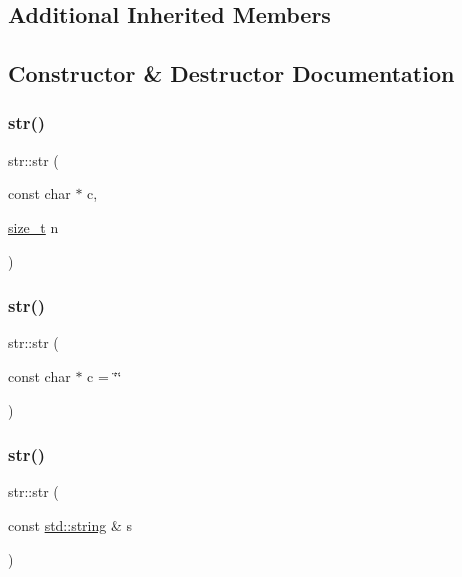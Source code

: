 \subsection*{Additional Inherited Members}


\subsection{Constructor \& Destructor Documentation}
\mbox{\label{classstr_a75cebb809550e845521f0a554452ddc3}} 
\subsubsection{\texorpdfstring{str()}{str()}\hspace{0.1cm}{\footnotesize\ttfamily [1/4]}}
{\footnotesize\ttfamily str\+::str (\begin{DoxyParamCaption}\item[{const char $\ast$}]{c,  }\item[{\mbox{\hyperlink{detail_2common_8h_a801d6a451a01953ef8cbae6feb6a3638}{size\+\_\+t}}}]{n }\end{DoxyParamCaption})\hspace{0.3cm}{\ttfamily [inline]}}

\mbox{\label{classstr_a7275e75f478d9a5eff2d28d4a9ca9768}} 
\subsubsection{\texorpdfstring{str()}{str()}\hspace{0.1cm}{\footnotesize\ttfamily [2/4]}}
{\footnotesize\ttfamily str\+::str (\begin{DoxyParamCaption}\item[{const char $\ast$}]{c = {\ttfamily \char`\"{}\char`\"{}} }\end{DoxyParamCaption})\hspace{0.3cm}{\ttfamily [inline]}}

\mbox{\label{classstr_aefc81e0d991f5df7e9d2e57a32308c33}} 
\subsubsection{\texorpdfstring{str()}{str()}\hspace{0.1cm}{\footnotesize\ttfamily [3/4]}}
{\footnotesize\ttfamily str\+::str (\begin{DoxyParamCaption}\item[{const \mbox{\hyperlink{_s_d_l__opengl__glext_8h_ab4ccfaa8ab0e1afaae94dc96ef52dde1}{std\+::string}} \&}]{s }\end{DoxyParamCaption})\hspace{0.3cm}{\ttfamily [inline]}}

